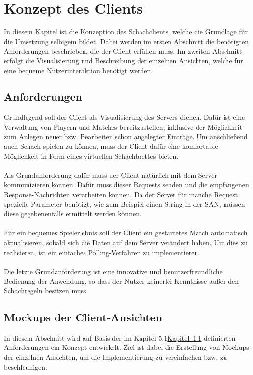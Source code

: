 
\chapter{Konzept des Clients}\label{sec:conceptClient}
In diesem Kapitel ist die Konzeption des Schachclients, welche die Grundlage für die Umsetzung selbigem bildet. Dabei werden im ersten Abschnitt die benötigten Anforderungen beschrieben, die der Client erfüllen muss. Im zweiten Abschnitt erfolgt die Visualisierung und Beschreibung der einzelnen Ansichten, welche für eine bequeme Nutzerinteraktion benötigt werden.

\section{Anforderungen}\label{sec:anforderungenClient}
Grundlegend soll der Client als Visualisierung des Servers dienen. Dafür ist eine Verwaltung von Playern und Matches bereitzustellen, inklusive der Möglichkeit zum Anlegen neuer bzw. Bearbeiten schon angelegter Einträge. Um anschließend auch Schach spielen zu können, muss der Client dafür eine komfortable Möglichkeit in Form eines virtuellen Schachbrettes bieten.\\
\\
Als Grundanforderung dafür muss der Client natürlich mit dem Server kommunizieren können. Dafür muss dieser Requests senden und die empfangenen Response-Nachrichten verarbeiten können. Da der Server für manche Request spezielle Parameter benötigt, wie zum Beispiel einen String in der \gls{SAN}, müssen diese gegebenenfalls ermittelt werden können.\\
\\
Für ein bequemes Spielerlebnis soll der Client ein gestartetes Match automatisch aktualisieren, sobald sich die Daten auf dem Server verändert haben. Um dies zu realisieren, ist ein einfaches Polling-Verfahren zu implementieren.\\
\\ 
Die letzte Grundanforderung ist eine innovative und benutzerfreundliche Bedienung der Anwendung, so dass der Nutzer keinerlei Kenntnisse außer den Schachregeln besitzen muss.

\section{Mockups der Client-Ansichten}\label{sec:views}
In diesem Abschnitt wird auf Basis der im Kapitel 5.1\hyperref[sec:anforderungenClient]{Kapitel~\ref{sec:anforderungenClient}} definierten Anforderungen ein Konzept entwickelt. Ziel ist dabei die Erstellung von Mockups der einzelnen Ansichten, um die Implementierung zu vereinfachen bzw. zu beschleunigen.

